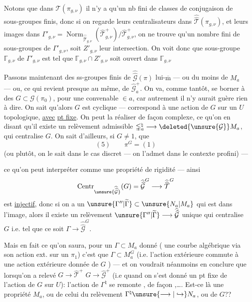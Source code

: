 Notons que dans $\mathcal T(\pi_{g,\nu})$ il n'y a
qu'un nb fini de classes de conjugaison
de sous-groupes finis, donc si on
regarde leurs centralisateurs  dans
$\widehat{\widehat{\mathcal T}}(\pi_{g,\nu})$, et leurs images dans
$\Gamma'_{g,\nu}=\operatorname{Norm}_{\widehat{\widehat{\mathcal T}}_{g,\nu}}(\widehat{\mathcal T}^{+}_{g,\nu})/\widehat{\mathcal T}^{+}_{g,\nu}$, on ne
trouve qu'un nombre fini de sous-groupes
de $\Gamma'_{g,\nu}$, soit $Z'_{g,\nu}$ leur intersection.
On voit donc que  sous-groupe $\mathbb{\Gamma}_{g,\nu}$
de $\Gamma'_{g,\nu}$ est tel que $\mathbb{\Gamma}_{g,\nu}\cap Z'_{g,\nu}$ soit
ouvert dans $\mathbb{\Gamma}_{g,\nu}$

Passons maintenant  des ss-groupes
finis de $\widehat{\widehat{\mathcal G}}(\pi)$ lui-$\overline{\mathrm m}$ --- ou du moins
de $M_a$ --- ou, ce qui revient presque au
même, de $\widehat{\mathcal G}^{+}_a$. On va, comme
tantôt, se borner à des $G\subset\mathcal G(\pi_0)$,
pour une  convenable $\in a$,
car autrement il n'y aurait guère rien à
dire. On sait qu'alors $G$ est
cyclique ---  correspond à une action
de $G$ sur un $U$ topologique, \uline{avec}
\uline{pt fixe}. On peut la réaliser de
façon complexe, ce qu'on  en
disant qu'il existe un relèvement
admissible $\mathbb{\Gamma}_a^{\natural}\longrightarrow\deleted{\unsure{\mathcal G}} M_a$, qui
centralise $G$. On sait d'ailleurs, si
$G\ne1$, que \deleted{$\unsure{\pi}$}
\[
(5)\qquad \pi^G=(1)
\]
(ou plutôt, on le sait dans le cas discret ---
on l'admet dans le contexte profini) ---

ce qu'on peut  interpréter comme une propriété de rigidité --- ainsi
\[
\operatorname{Centr}_{\unsure{\widehat{\widehat{\mathcal G}}}}(G)
=\widehat{\widehat{\mathcal G}}^{G}
\longrightarrow\widehat{\widehat{\mathcal T}}^{G}
\]
est \uline{injectif}, donc si on a un $\unsure{\Gamma''|\widetilde{\Gamma}}\subset\unsure{N_a|M_a}$ qui est dans l'image, alors il existe un relèvement $\unsure{\Gamma''|\widetilde{\Gamma}}\longrightarrow\widehat{\widehat{\mathcal G}}$ unique qui centralise $G$ i.e. tel que ce soit $\Gamma\longrightarrow\widehat{\widehat{\mathcal G}}^{G}$.

Mais en fait ce qu'on saura, pour un $\Gamma\subset M_a$ donné ( une courbe algébrique via son action ext. sur un $\pi_1$) c'est que $\Gamma\subset M_a^G$ (i.e. l'action extérieure commute à une action extérieure donnée de $G$ ) --- et on voudrait néanmoins en conclure que lorsqu'on a relevé $G\longrightarrow\widehat{\mathcal T}^{+}$  $G\longrightarrow\widehat{\mathcal G}^{+}$ (i.e quand on s'est donné un pt fixe de l'action de $G$ sur $U$):  l'action de $\Gamma^{\natural}$ se remonte  ,  de façon  ,\ldots . Est-ce là une propriété  $M_a$, ou de celui du relèvement $\Gamma^{\natural}\unsure{\longrightarrow|\hookrightarrow}N_a$, ou de $G$??

